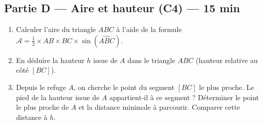 
\bigskip

\subsection*{Partie D — Aire et hauteur (C4) — 15 min}

\begin{enumerate}[resume]
  \item Calculer l'aire du triangle $ABC$ à l'aide de la formule $\mathcal{A} = \frac{1}{2} \times AB \times BC \times \sin(\widehat{ABC})$.
  \item En déduire la hauteur $h$ issue de $A$ dans le triangle $ABC$ (hauteur relative au côté $[BC]$).
  \item Depuis le refuge $A$, on cherche le point du segment $[BC]$ le plus proche. Le pied de la hauteur issue de $A$ appartient-il à ce segment ? Déterminer le point le plus proche de $A$ et la distance minimale à parcourir. Comparer cette distance à $h$.
\end{enumerate}


